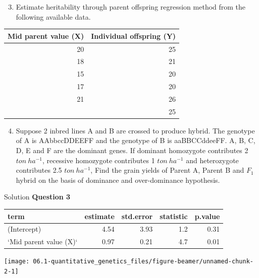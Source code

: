 \documentclass[11pt,dvipsnames,ignorenonframetext,aspectratio=169]{beamer}
\providecommand{\tightlist}{%
  \setlength{\itemsep}{0pt}\setlength{\parskip}{0pt}}
\begin{document}
\begin{frame}{}
\protect\hypertarget{section-23}{}
\begin{enumerate}
\setcounter{enumi}{2}
\tightlist
\item
  Estimate heritability through parent offspring regression method from
  the following available data.
\end{enumerate}

\begin{table}
\centering\begingroup\fontsize{6}{8}\selectfont

\begin{tabular}{rr}
\toprule
Mid parent value (X) & Individual offspring (Y)\\
\midrule
20 & 25\\
18 & 21\\
15 & 20\\
17 & 20\\
21 & 26\\
\addlinespace
22 & 25\\
\bottomrule
\end{tabular}
\endgroup{}
\end{table}
\end{frame}

\begin{frame}{}
\protect\hypertarget{section-24}{}
\begin{enumerate}
\setcounter{enumi}{3}
\tightlist
\item
  Suppose 2 inbred lines A and B are crossed to produce hybrid. The
  genotype of A is AAbbccDDEEFF and the genotype of B is aaBBCCddeeFF.
  A, B, C, D, E and F are the dominant genes. If dominant homozygote
  contributes 2 \(ton~ha^{-1}\), recessive homozygote contributes 1
  \(ton~ha^{-1}\) and heterozygote contributes 2.5 \(ton~ha^{-1}\), Find
  the grain yields of Parent A, Parent B and \(F_1\) hybrid on the basis
  of dominance and over-dominance hypothesis.
\end{enumerate}
\end{frame}

\begin{frame}{Solution}
\protect\hypertarget{solution-3}{}
\textbf{Question 3}

\begin{tabular}{lrrrr}
\toprule
term & estimate & std.error & statistic & p.value\\
\midrule
(Intercept) & 4.54 & 3.93 & 1.2 & 0.31\\
`Mid parent value (X)` & 0.97 & 0.21 & 4.7 & 0.01\\
\bottomrule
\end{tabular}

\texttt{[image: 06.1-quantitative\_genetics\_files/figure-beamer/unnamed-chunk-2-1]}
\end{frame}
\end{document}
